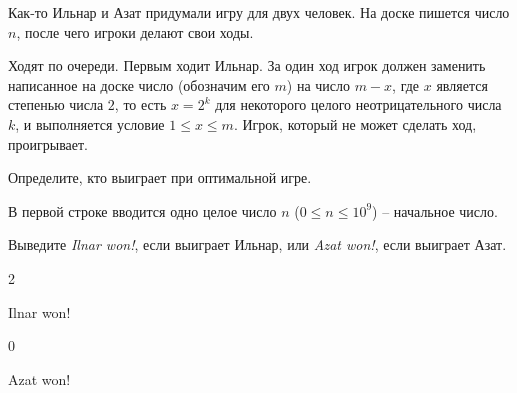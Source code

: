 
Как-то Ильнар и Азат придумали игру для двух человек. На доске пишется число $n$, после чего игроки делают свои ходы.

Ходят по очереди. Первым ходит Ильнар. За один ход игрок должен заменить написанное на доске число (обозначим его $m$) на число $m-x$, где $x$ является степенью числа $2$, то есть $x = 2^k$ для некоторого целого неотрицательного числа $k$, и выполняется условие $1 \le x \le m$. Игрок, который не может сделать ход, проигрывает.

Определите, кто выиграет при оптимальной игре.


В первой строке вводится одно целое число $n$ ($0 \le n \le 10^9$) -- начальное число.

\outputfmtSection

Выведите \textit{Ilnar won!}, если выиграет Ильнар, или \textit{Azat won!}, если выиграет Азат.

\exampleSection


\begin{myverbbox}[\small]{\vinput}
2
\end{myverbbox}
\begin{myverbbox}[\small]{\voutput}
Ilnar won!
\end{myverbbox}


\begin{myverbbox}[\small]{\vinput}
0
\end{myverbbox}
\begin{myverbbox}[\small]{\voutput}
Azat won!
\end{myverbbox}


